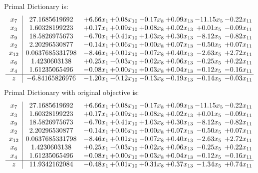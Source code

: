 \documentclass[8pt]{article}
\begin{document}
Primal Dictionary is:
\[\begin{array}{c| c c@{\hskip 2pt} c@{\hskip 2pt} c@{\hskip 2pt} c@{\hskip 2pt} c@{\hskip 2pt} c@{\hskip 2pt} }
 x_{7}   &  27.1685619692 & +  6.66 x_{1} & +  0.08 x_{10} & -0.17 x_{8} & +  0.09 x_{13} & -11.15 x_{5} & -0.22 x_{11}\\
 x_{3}   &  1.60328199223 & +  0.17 x_{1} & +  0.09 x_{10} & +  0.08 x_{8} & +  0.02 x_{13} & +  0.01 x_{5} & -0.09 x_{11}\\
 x_{9}   &  18.5826975673 & -6.70 x_{1} & +  0.41 x_{10} & +  1.03 x_{8} & +  0.30 x_{13} & -8.12 x_{5} & -0.82 x_{11}\\
 x_{2}   &  2.20296530877 & -0.14 x_{1} & +  0.06 x_{10} & +  0.00 x_{8} & +  0.07 x_{13} & -0.50 x_{5} & +  0.07 x_{11}\\
 x_{12}   &  0.0637685331798 & -8.46 x_{1} & +  0.01 x_{10} & -0.07 x_{8} & +  0.40 x_{13} & -2.63 x_{5} & +  2.72 x_{11}\\
 x_{6}   &  1.4230603138 & +  0.25 x_{1} & -0.03 x_{10} & +  0.02 x_{8} & +  0.06 x_{13} & -0.25 x_{5} & +  0.22 x_{11}\\
 x_{4}   &  1.61235065496 & -0.08 x_{1} & +  0.00 x_{10} & +  0.03 x_{8} & +  0.04 x_{13} & -0.12 x_{5} & -0.16 x_{11}\\
\hline
z    &  -6.84165826976 & -1.20 x_{1} & -0.12 x_{10} & -0.13 x_{8} & -0.19 x_{13} & -0.14 x_{5} & -0.03 x_{11}\\
\end{array}\]
Primal Dictionary with original objective is:
\[\begin{array}{c| c c@{\hskip 2pt} c@{\hskip 2pt} c@{\hskip 2pt} c@{\hskip 2pt} c@{\hskip 2pt} c@{\hskip 2pt} }
 x_{7}   &  27.1685619692 & +  6.66 x_{1} & +  0.08 x_{10} & -0.17 x_{8} & +  0.09 x_{13} & -11.15 x_{5} & -0.22 x_{11}\\
 x_{3}   &  1.60328199223 & +  0.17 x_{1} & +  0.09 x_{10} & +  0.08 x_{8} & +  0.02 x_{13} & +  0.01 x_{5} & -0.09 x_{11}\\
 x_{9}   &  18.5826975673 & -6.70 x_{1} & +  0.41 x_{10} & +  1.03 x_{8} & +  0.30 x_{13} & -8.12 x_{5} & -0.82 x_{11}\\
 x_{2}   &  2.20296530877 & -0.14 x_{1} & +  0.06 x_{10} & +  0.00 x_{8} & +  0.07 x_{13} & -0.50 x_{5} & +  0.07 x_{11}\\
 x_{12}   &  0.0637685331798 & -8.46 x_{1} & +  0.01 x_{10} & -0.07 x_{8} & +  0.40 x_{13} & -2.63 x_{5} & +  2.72 x_{11}\\
 x_{6}   &  1.4230603138 & +  0.25 x_{1} & -0.03 x_{10} & +  0.02 x_{8} & +  0.06 x_{13} & -0.25 x_{5} & +  0.22 x_{11}\\
 x_{4}   &  1.61235065496 & -0.08 x_{1} & +  0.00 x_{10} & +  0.03 x_{8} & +  0.04 x_{13} & -0.12 x_{5} & -0.16 x_{11}\\
\hline
z    &  11.9342162084 & -0.48 x_{1} & +  0.01 x_{10} & +  0.31 x_{8} & +  0.37 x_{13} & -1.34 x_{5} & +  0.74 x_{11}\\
\end{array}\]
\end{document}

